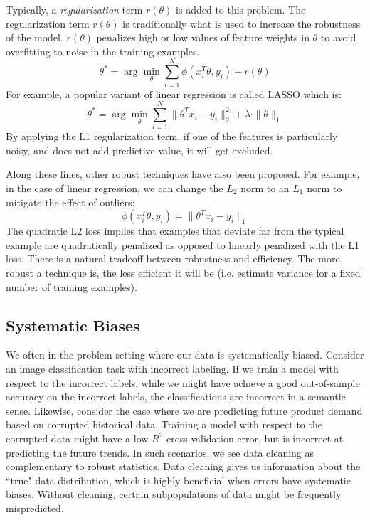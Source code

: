 Typically, a \emph{regularization} term $r(\theta)$ is added to this problem.
The regularization term $r(\theta)$ is traditionally what is used to increase the robustness of the model.
$r(\theta)$ penalizes high or low values of feature weights in $\theta$ to avoid overfitting to noise in the
training examples.
\[
 \theta^{*}=\arg\min_{\theta}\sum_{i=1}^{N}\phi(x_{i}^T\theta,y_{i}) + r(\theta)
\]
For example, a popular variant of linear regression is called LASSO which is:
\[
 \theta^{*}=\arg\min_{\theta}\sum_{i=1}^{N}\|\theta^Tx_{i} - y_i \|_2^2 + \lambda \cdot \|\theta\|_1
\]
By applying the L1 regularization term, if one of the features is particularly noisy, and does not add predictive value, it will get excluded.

Along these lines, other robust techniques have also been proposed.
For example, in the case of linear regression, we can change the $L_2$ norm to an $L_1$ norm to mitigate the effect of outliers:
\[
\phi(x_{i}^T\theta,y_{i}) = \|\theta^Tx_{i} - y_i \|_1
\]
The quadratic L2 loss implies that examples that deviate far from the typical example are quadratically penalized as opposed to linearly penalized with the L1 loss.
There is a natural tradeoff between robustness and efficiency.
The more robust a technique is, the less efficient it will be (i.e. estimate variance for a fixed number of training examples).

\subsection{Systematic Biases}
We often in the problem setting where our data is systematically biased.
Consider an image classification task with incorrect labeling.
If we train a model with respect to the incorrect labels, while we might have achieve a good out-of-sample accuracy on the incorrect labels, the classifications are incorrect in a semantic sense.
Likewise, consider the case where we are predicting future product demand based on corrupted historical data.
Training a model with respect to the corrupted data might have a low $R^2$ cross-validation error, but is incorrect
at predicting the future trends.
In such scenarios, we see data cleaning as complementary to robust statistics.
Data cleaning gives us information about the ``true" data distribution, which is highly beneficial when errors have systematic biases.
Without cleaning, certain subpopulations of data might be frequently mispredicted. 

